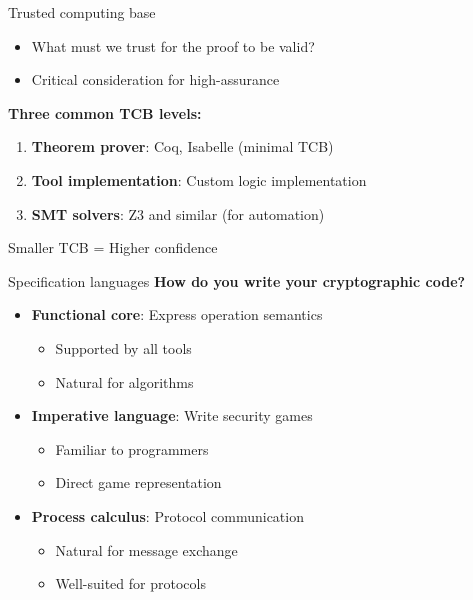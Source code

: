 \documentclass[aspectratio=169, lualatex, handout]{beamer}
\begin{document}
\begin{frame}{Trusted computing base}
	\begin{itemize}
		\item What must we trust for the proof to be valid?
		\item Critical consideration for high-assurance
	\end{itemize}
	\vspace{0.5em}
	\textbf{Three common TCB levels:}
	\begin{enumerate}
		\item \textbf{Theorem prover}: Coq, Isabelle (minimal TCB)
		\item \textbf{Tool implementation}: Custom logic implementation
		\item \textbf{SMT solvers}: Z3 and similar (for automation)
	\end{enumerate}
	\vspace{0.5em}
	\begin{center}
		Smaller TCB = Higher confidence
	\end{center}
\end{frame}

\begin{frame}{Specification languages}
	\textbf{How do you write your cryptographic code?}
	\vspace{0.5em}
	\begin{itemize}
		\item \textbf{Functional core}: Express operation semantics
		      \begin{itemize}
			      \item Supported by all tools
			      \item Natural for algorithms
		      \end{itemize}
		\item \textbf{Imperative language}: Write security games
		      \begin{itemize}
			      \item Familiar to programmers
			      \item Direct game representation
		      \end{itemize}
		\item \textbf{Process calculus}: Protocol communication
		      \begin{itemize}
			      \item Natural for message exchange
			      \item Well-suited for protocols
		      \end{itemize}
	\end{itemize}
\end{frame}
\end{document}
